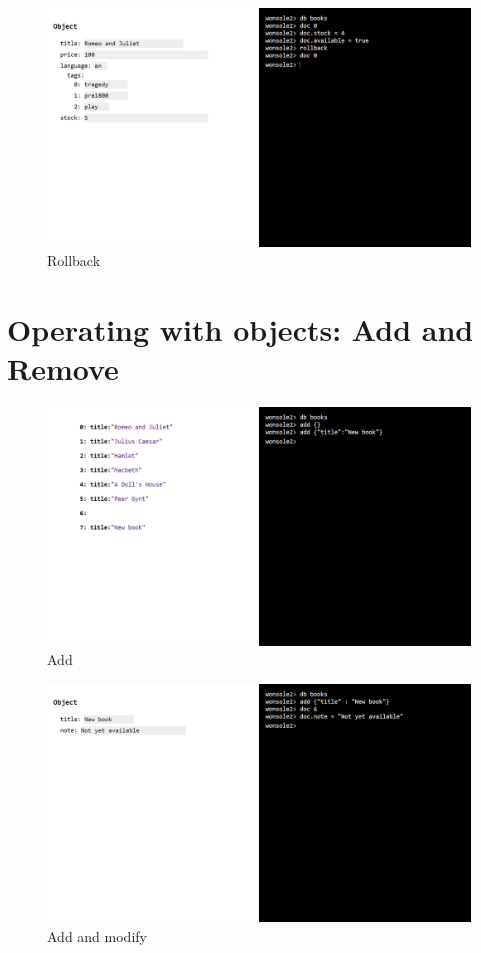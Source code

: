 \documentclass[10pt,a4paper,oneside]{report}
\begin{document}
\begin{figure}
\centering
\includegraphics[width=\textwidth]{screenshot/wonsole2/wonsole2-43.png}
\caption{Rollback}
\label{wonsole2-43}
\end{figure}


\section{Operating with objects: Add and Remove}
\begin{figure}
\centering
\includegraphics[width=\textwidth]{screenshot/wonsole2/wonsole2-48.png}
\caption{Add}
\label{wonsole2-48}
\end{figure}

\begin{figure}
\centering
\includegraphics[width=\textwidth]{screenshot/wonsole2/wonsole2-55.png}
\caption{Add and modify}
\label{wonsole2-55}
\end{figure}
\end{document}
